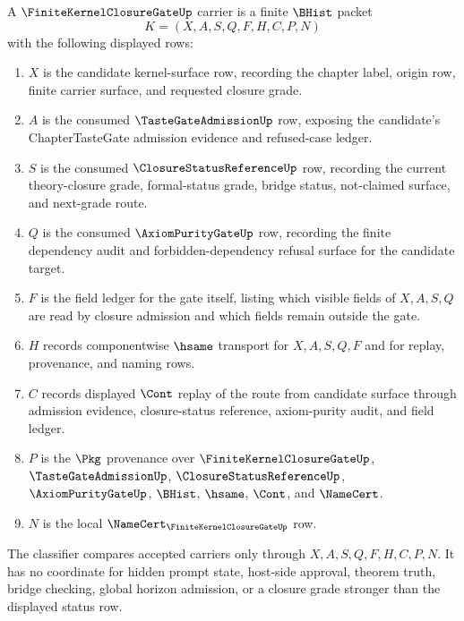 \begin{definition}
\label{def:finite-kernel-closure-gate}
A $\FiniteKernelClosureGateUp$ carrier is a finite $\BHist$ packet
$$
K=(X,A,S,Q,F,H,C,P,N)
$$
with the following displayed rows:
\begin{enumerate}
\item $X$ is the candidate kernel-surface row, recording the chapter label, origin row, finite carrier surface, and requested closure grade.
\item $A$ is the consumed $\TasteGateAdmissionUp$ row, exposing the candidate's ChapterTasteGate admission evidence and refused-case ledger.
\item $S$ is the consumed $\ClosureStatusReferenceUp$ row, recording the current theory-closure grade, formal-status grade, bridge status, not-claimed surface, and next-grade route.
\item $Q$ is the consumed $\AxiomPurityGateUp$ row, recording the finite dependency audit and forbidden-dependency refusal surface for the candidate target.
\item $F$ is the field ledger for the gate itself, listing which visible fields of $X,A,S,Q$ are read by closure admission and which fields remain outside the gate.
\item $H$ records componentwise $\hsame$ transport for $X,A,S,Q,F$ and for replay, provenance, and naming rows.
\item $C$ records displayed $\Cont$ replay of the route from candidate surface through admission evidence, closure-status reference, axiom-purity audit, and field ledger.
\item $P$ is the $\Pkg$ provenance over $\FiniteKernelClosureGateUp$, $\TasteGateAdmissionUp$, $\ClosureStatusReferenceUp$, $\AxiomPurityGateUp$, $\BHist$, $\hsame$, $\Cont$, and $\NameCert$.
\item $N$ is the local $\NameCert_{\FiniteKernelClosureGateUp}$ row.
\end{enumerate}
The classifier compares accepted carriers only through $X,A,S,Q,F,H,C,P,N$. It has no coordinate for hidden prompt state, host-side approval, theorem truth, bridge checking, global horizon admission, or a closure grade stronger than the displayed status row.
\end{definition}

